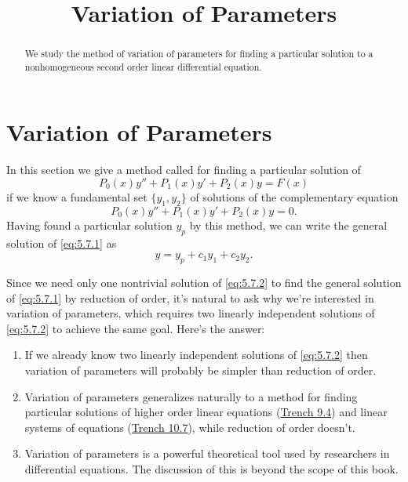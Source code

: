 \documentclass{ximera}
\title{Variation of Parameters}
\begin{document}
 
\begin{abstract}
 We study the method of variation of parameters for finding a particular solution to a nonhomogeneous second order linear differential equation.
\end{abstract}
 
\maketitle
 
\section*{Variation of Parameters}
 
In this section we give a method called  for finding a particular solution of
\begin{equation} \label{eq:5.7.1}
P_0(x)y''+P_1(x)y'+P_2(x)y=F(x)
\end{equation}
if we know a fundamental set $\{y_1,y_2\}$ of solutions of  the
complementary equation
\begin{equation} \label{eq:5.7.2}
P_0(x)y''+P_1(x)y'+P_2(x)y=0.
\end{equation}
Having found a particular solution $y_p$ by this method, we can write
the general solution of \eqref{eq:5.7.1} as
$$
y=y_p+c_1y_1+c_2y_2.
$$
 
Since we need only one nontrivial solution of \eqref{eq:5.7.2} to find the
general solution of \eqref{eq:5.7.1} by reduction of order, it's natural
to ask why we're interested in variation of parameters, which requires
two linearly independent solutions of \eqref{eq:5.7.2} to achieve the same
goal. Here's the answer:
 
\begin{enumerate}
\item If we already know two linearly independent solutions of
\eqref{eq:5.7.2} then  variation of parameters will probably  be simpler
than reduction of order.
 
\item Variation of parameters generalizes naturally to a method
for finding particular solutions of higher order
linear equations (\href{https://ximera.osu.edu/ode/main/varParHigherOrder/varParHigherOrder}{Trench 9.4}) and  linear systems of
equations
(\href{https://ximera.osu.edu/ode/main/varParamNonHomLinSys/varParamNonHomLinSys}{Trench 10.7}), while reduction of order doesn't.
 
\item Variation of parameters is a powerful theoretical tool
 used by researchers in differential equations. The discussion of this is beyond the scope of this book.
  
 \end{enumerate}
 
\end{document}
